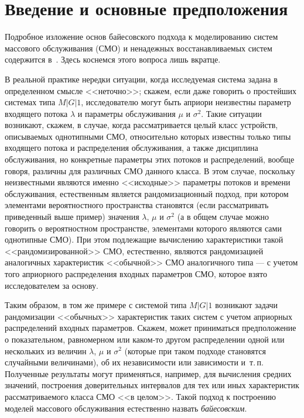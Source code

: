       \begin{multicols}{2}

      \label{st\stat}

\section{Введение и основные предположения}

Подробное изложение основ байесовского подхода к моделированию сис\-тем массового обслуживания 
(СМО) и ненадежных
восстанавливаемых сис\-тем содержится в~\cite{1k, 2k}. Здесь коснемся этого вопроса лишь вкратце.

В реальной практике нередки ситуации, когда исследуемая система задана в определенном смыс\-ле <<неточно>>; скажем,
если даже говорить о прос\-тей\-ших сис\-те\-мах типа $M\vert G\vert 1$, исследователю могут быть априори неизвестны параметр входящего
потока $\lambda$ и параметры обслуживания $\mu$ и $\sigma^2$. Такие ситуации возникают, скажем, в случае, когда
рассматривается целый класс устройств, описываемых однотипными СМО, относительно
которых известны только типы входящего потока и распределения обслуживания, а также дисциплина обслуживания, но
конкретные параметры этих потоков и распределений, вообще говоря, различны для различных СМО данного класса. В этом
случае, поскольку неизвестными являются именно <<исходные>> параметры потоков и времени обслуживания, естественным
является рандомизационный подход, при котором элементами вероятностного пространства становятся (если рассматривать
приведенный выше пример) значения $\lambda$, $\mu$ и $\sigma^2$ (а в общем случае можно говорить о вероятностном
пространстве, элементами которого являются сами однотипные СМО). При этом подлежащие вычислению характеристики такой
<<рандомизированной>> СМО, естественно, являются рандомизацией аналогичных характеристик <<обычной>> СМО аналогичного
типа --- с учетом того априорного распределения входных параметров СМО, которое взято исследователем за основу.

Таким образом, в том же примере с системой типа $M\vert G\vert 1$ возникают задачи рандомизации <<обычных>> характеристик таких
систем с учетом априорных распределений входных параметров. Скажем, может приниматься предположение о показательном,
равномерном или каком-то другом распределении одной или нескольких из величин $\lambda$, $\mu$ и $\sigma^2$ (которые
при таком подходе становятся случайными величинами), об их независимости или зависимости и~т.\,п. Полученные результаты
могут применяться, например, для вычисления средних значений, построения доверительных интервалов для тех или иных
характеристик рассматриваемого класса СМО <<в целом>>. Такой подход к по\-стро\-ению моделей массового обслуживания
естественно назвать \textit{байесовским}.


\end{multicols}
